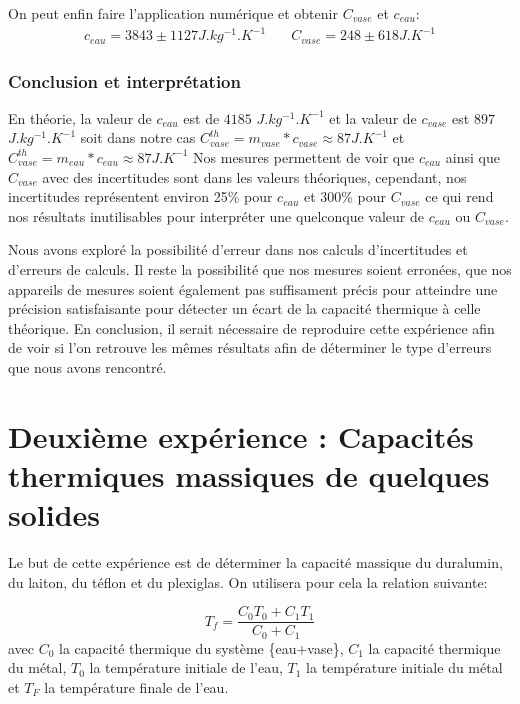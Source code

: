 \documentclass[12pt]{article}
\begin{document}
On peut enfin faire l'application numérique et obtenir $C_{vase}$ et $c_{eau}$:
\begin{align}
	c_{eau} = 3843 \pm 1127 J.kg^{-1}.K^{-1} & \quad C_{vase} = 248 \pm 618 J.K^{-1}
\end{align}


\subsubsection{Conclusion et interprétation}
En théorie, la valeur de $c_{eau}$ est de $4185$ $J.kg^{-1}.K^{-1}$ et la valeur de $c_{vase}$ est $897$ $J.kg^{-1}.K^{-1}$ soit dans notre cas $C_{vase}^{th} = m_{vase} * c_{vase} \approx 87 J.K^{-1}$ et $C_{vase}^{th} = m_{eau} * c_{eau} \approx 87 J.K^{-1}$
Nos mesures permettent de voir que $c_{eau}$ ainsi que $C_{vase}$ avec des incertitudes sont dans les valeurs théoriques, cependant, nos incertitudes représentent environ 25\% pour $c_{eau}$
et 300\% pour $C_{vase}$ ce qui rend nos résultats inutilisables pour interpréter une quelconque valeur de $c_{eau}$ ou $C_{vase}$. 

Nous avons exploré la possibilité d'erreur dans nos calculs d'incertitudes et d'erreurs de calculs. Il reste la possibilité que nos mesures soient erronées, que nos appareils de mesures soient également pas suffisament précis 
pour atteindre une précision satisfaisante pour détecter un écart de la capacité thermique à celle théorique. En conclusion, il serait nécessaire de reproduire cette expérience afin de voir si l'on retrouve les mêmes résultats afin de déterminer le type d'erreurs que nous avons rencontré.

\newpage
\section{Deuxième expérience : Capacités thermiques massiques de quelques solides}

Le but de cette expérience est de déterminer la capacité massique du duralumin, du laiton, du téflon et du plexiglas. On utilisera pour cela la relation suivante:

\begin{equation}
	T_f=\frac{C_0T_0+C_1T_1}{C_0+C_1}
\label{EquationTf}
\end{equation}
avec $C_0$ la capacité thermique du système \{eau+vase\}, $C_1$ la capacité thermique du métal, $T_0$ la température initiale de l'eau, $T_1$ la température initiale du métal et $T_F$ la température finale de l'eau.
\end{document}
